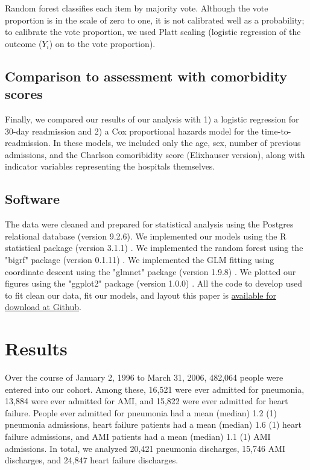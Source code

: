 \documentclass[]{article}\usepackage[]{graphicx}\usepackage[]{color}
\begin{document}
Random forest classifies each item by majority vote. Although the vote proportion is in the scale of zero to one, it is not calibrated well as a probability; to calibrate the vote proportion, we used Platt scaling (logistic regression of the outcome ($Y_i$) on to the vote proportion). 


\subsection{Comparison to assessment with comorbidity scores}
Finally, we compared our results of our analysis with 1) a logistic regression for 30-day readmission and 2) a Cox proportional hazards model for the time-to-readmission. In these models, we included only the age, sex, number of previous admissions, and the Charlson comoribidity score (Elixhauser version), along with indicator variables representing the hospitals themselves.

\subsection{Software}
The data were cleaned and prepared for statistical analysis using the Postgres relational database (version 9.2.6). We implemented our models using the R statistical package (version 3.1.1) \supercite{team_r:_2014}. We implemented the random forest using the "bigrf" package (version 0.1.11) \supercite{lim_bigrf:_2014}. We implemented the GLM fitting using coordinate descent using the "glmnet" package (version 1.9.8) \supercite{friedman_regularization_2010}. We plotted our figures using the "ggplot2" package (version 1.0.0) \supercite{wickham_ggplot2:_2009}. All the code to develop used to fit clean our data, fit our models, and layout this paper is \href{https://github.com/nograpes/tmle_readmissions}{available for download at Github}.

\section{Results}


Over the course of January 2, 1996 to March 31, 2006, 482,064 people were entered into our cohort. Among these, 16,521 were ever admitted for pneumonia, 13,884 were ever admitted for AMI, and 15,822 were ever admitted for heart failure. People ever admitted for pneumonia had a mean (median) 1.2 (1) pneumonia admissions, heart failure patients had a mean (median) 1.6 (1) heart failure admissions, and AMI patients had a mean (median) 1.1 (1) AMI admissions. In total, we analyzed 20,421 pneumonia discharges, 15,746 AMI discharges, and 24,847 heart failure discharges.
\end{document}
